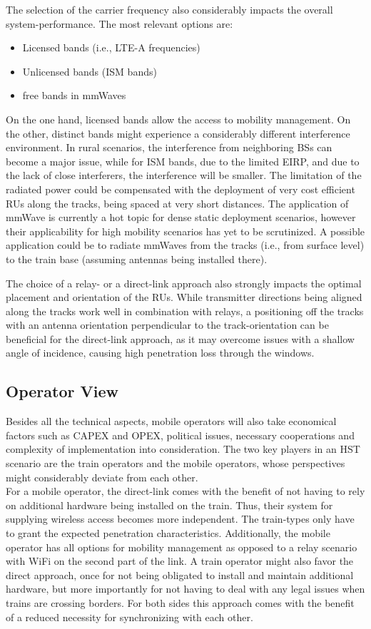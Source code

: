 \documentclass[a4paper,conference,twocolumn,10pt]{IEEEtran}
\begin{document}
The selection of the carrier frequency also considerably impacts the overall system-performance. The most relevant options are:
\begin{itemize}
	\item Licensed bands (i.e., \ac{LTE-A} frequencies)
	\item Unlicensed bands (\ac{ISM} bands)
	\item free bands in mmWaves
\end{itemize}
On the one hand, licensed bands allow the access to mobility management. On the other, distinct bands might experience a considerably different interference environment. In rural scenarios, the interference from neighboring \acp{BS} can become a major issue, while for \ac{ISM} bands, due to the limited \ac{EIRP}, and due to the lack of close interferers, the interference will be smaller. The limitation of the radiated power could be compensated with the deployment of very cost efficient \acp{RU} along the tracks, being spaced at very short distances. The application of mmWave is currently a hot topic for dense static deployment scenarios, however their applicability for high mobility scenarios has yet to be scrutinized. A possible application could be to radiate mmWaves from the tracks (i.e., from surface level) to the train base (assuming antennas being installed there).

The choice of a relay- or a direct-link approach also strongly impacts the optimal placement and orientation of the \acp{RU}. While transmitter directions being aligned along the tracks work well in combination with relays, a positioning off the tracks with an antenna orientation perpendicular to the track-orientation can be beneficial for the direct-link approach, as it may overcome issues with a shallow angle of incidence, causing high penetration loss through the windows.

\subsection{Operator View}
Besides all the technical aspects, mobile operators will also take economical factors such as \ac{CAPEX} and \ac{OPEX}, political issues, necessary cooperations and complexity of implementation into consideration. The two key players in an \ac{HST} scenario are the train operators and the mobile operators, whose perspectives might considerably deviate from each other.\\

For a mobile operator, the direct-link comes with the benefit of not having to rely on additional hardware being installed on the train. Thus, their system for supplying wireless access becomes more independent. The train-types only have to grant the expected penetration characteristics. Additionally, the mobile operator has all options for mobility management as opposed to a relay scenario with WiFi on the second part of the link. A train operator might also favor the direct approach, once for not being obligated to install and maintain additional hardware, but more importantly for not having to deal with any legal issues when trains are crossing borders. For both sides this approach comes with the benefit of a reduced necessity for synchronizing with each other.
\end{document}

